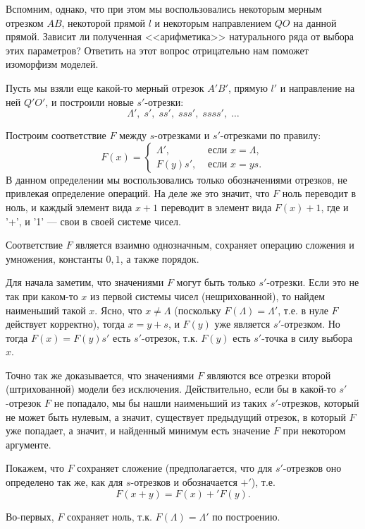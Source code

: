 Вспомним, однако, что при этом мы воспользовались некоторым мерным отрезком $AB$, некоторой прямой $l$ и некоторым направлением $QO$ на данной прямой. Зависит ли полученная <<арифметика>> натурального ряда от выбора этих параметров? Ответить на этот вопрос отрицательно нам поможет изоморфизм моделей.

Пусть мы взяли еще какой-то мерный отрезок $A'B'$, прямую $l'$ и направление на ней $Q'O'$, и построили новые $s'$-отрезки:
$$
\Lambda',\; s',\;ss',\;sss',\;ssss',\;\dots
$$

Построим соответствие $F$ между $s$-отрезками и $s'$-отрезками по правилу:
$$
F(x)=\begin{cases}
\Lambda', & \mbox{ если }x=\Lambda,\\
F(y)s', & \mbox{ если }x=ys.
\end{cases}
$$
В данном определении мы воспользовались только обозначениями отрезков, не привлекая определение операций. На деле же это значит, что $F$ ноль переводит в ноль, и каждый элемент вида $x+1$ переводит в элемент вида $F(x)+1$, где и '+', и '1' --- свои в своей системе чисел.

\begin{thrm}[Об изоморфизме]
Соответствие $F$ является взаимно однозначным, сохраняет операцию сложения и умножения, константы $0,1$, а также порядок.
\end{thrm}
\pf
Для начала заметим, что значениями $F$ могут быть только $s'$-отрезки. Если это не так при каком-то $x$ из первой системы чисел (нешрихованной), то найдем наименьший такой $x$. Ясно, что $x\ne\Lambda$ (поскольку $F(\Lambda)=\Lambda'$, т.е. в нуле $F$ действует корректно), тогда $x=y+s$, и $F(y)$ уже является $s'$-отрезком.
Но тогда $F(x)=F(y)s'$ есть $s'$-отрезок, т.к. $F(y)$ есть $s'$-точка в силу выбора $x$.

Точно так же доказывается, что значениями $F$ являются все отрезки второй (штрихованной) модели без исключения. Действительно, если бы в какой-то $s'$-отрезок $F$ не попадало, мы бы нашли наименьший из таких $s'$-отрезков, который не может быть нулевым, а значит, существует предыдущий отрезок, в который $F$ уже попадает, а значит, и найденный минимум есть значение $F$ при некотором аргументе.

Покажем, что $F$ сохраняет сложение (предполагается, что для $s'$-отрезков оно определено так же, как для $s$-отрезков и обозначается $+'$), т.е.
$$
F(x+y)=F(x)+'F(y).
$$

Во-первых, $F$ сохраняет ноль, т.к. $F(\Lambda)=\Lambda'$ по построению.

